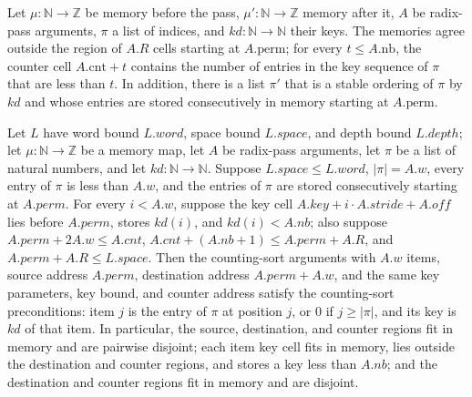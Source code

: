 \begin{definition}
\label{Light.RadixPass.Post}
\leanok
{}
Let $\mu:\mathbb{N}\to\mathbb{Z}$ be memory before the pass,
$\mu':\mathbb{N}\to\mathbb{Z}$ memory after it, $A$ be radix-pass arguments, $\pi$ a
list of indices, and $kd:\mathbb{N}\to\mathbb{N}$ their keys. The memories agree outside
the region of $A.R$ cells starting at $A.\mathrm{perm}$; for every $t\le A.\mathrm{nb}$,
the counter cell $A.\mathrm{cnt}+t$ contains the number of entries in the key sequence
of $\pi$ that are less than $t$. In addition, there is a list $\pi'$ that is a stable
ordering of $\pi$ by $kd$ and whose entries are stored consecutively in memory starting
at $A.\mathrm{perm}$.
\end{definition}

\begin{theorem}
\label{Light.RadixPass.Pre.sort}
\leanok
{}
Let $L$ have word bound $L.word$, space bound $L.space$, and depth bound $L.depth$; let
$\mu:\mathbb{N}\to\mathbb{Z}$ be a memory map, let $A$ be radix-pass arguments, let
$\pi$ be a list of natural numbers, and let $kd:\mathbb{N}\to\mathbb{N}$. Suppose
$L.space\le L.word$, $|\pi|=A.w$, every entry of $\pi$ is less than $A.w$, and the
entries of $\pi$ are stored consecutively starting at $A.perm$. For every $i<A.w$,
suppose the key cell $A.key+i\cdot A.stride+A.off$ lies before $A.perm$, stores $kd(i)$,
and $kd(i)<A.nb$; also suppose $A.perm+2A.w\le A.cnt$, $A.cnt+(A.nb+1)\le A.perm+A.R$,
and $A.perm+A.R\le L.space$. Then the counting-sort arguments with $A.w$ items, source
address $A.perm$, destination address $A.perm+A.w$, and the same key parameters, key
bound, and counter address satisfy the counting-sort preconditions: item $j$ is the
entry of $\pi$ at position $j$, or $0$ if $j\ge|\pi|$, and its key is $kd$ of that item.
In particular, the source, destination, and counter regions fit in memory and are
pairwise disjoint; each item key cell fits in memory, lies outside the destination and
counter regions, and stores a key less than $A.nb$; and the destination and counter
regions fit in memory and are disjoint.
\end{theorem}

